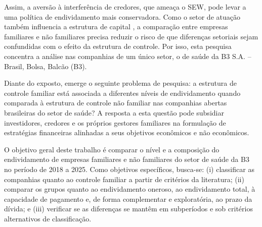 Assim, a aversão à interferência de credores, que ameaça o SEW, pode levar a uma
política de endividamento mais conservadora. Como o
setor de atuação também influencia a estrutura de capital \cite{oliveira2020}, a
comparação entre empresas familiares e não familiares precisa reduzir o risco de
que diferenças setoriais sejam confundidas com o efeito da estrutura de controle. Por
isso, esta pesquisa concentra a análise nas companhias de um único setor, o de
saúde da B3 S.A. -- Brasil, Bolsa, Balcão (B3).

Diante do exposto, emerge o seguinte problema de pesquisa: a estrutura de controle
familiar está associada a diferentes níveis de endividamento quando comparada à
estrutura de controle não familiar nas companhias abertas brasileiras do setor de
saúde? A resposta a esta questão pode subsidiar investidores, credores e os
próprios gestores familiares na formulação de estratégias financeiras alinhadas a
seus objetivos econômicos e não econômicos.

O objetivo geral deste trabalho é comparar o nível e a composição do endividamento
de empresas familiares e não familiares do setor de saúde da B3 no período de 2018
a 2025. Como objetivos específicos, busca-se: (i) classificar as companhias quanto
ao controle familiar a partir de critérios da literatura; (ii) comparar os grupos
quanto ao endividamento oneroso, ao endividamento total, à capacidade de pagamento
e, de forma complementar e exploratória, ao prazo da dívida; e (iii) verificar se as diferenças se mantêm em subperíodos e
sob critérios alternativos de classificação.

